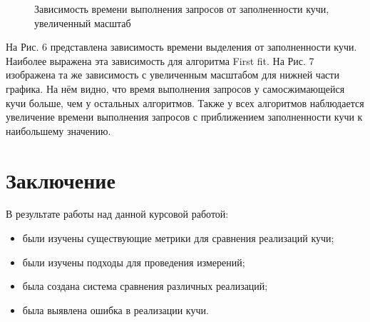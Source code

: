 \documentclass[12pt,a4paper]{article}
\begin{document}
   \begin{figure}[p]
   \caption{Зависимость времени выполнения запросов от заполненности кучи, увеличенный масштаб}
   \label{ris:image}
   \end{figure}
   
   На Рис. 6 представлена зависимость времени выделения от заполненности кучи. Наиболее выражена эта зависимость для алгоритма First fit. На Рис. 7 изображена та же
   зависимость с увеличенным масштабом для нижней части графика. На нём видно, что время выполнения запросов у самосжимающейся кучи больше, чем у остальных 
   алгоритмов. Также у всех алгоритмов наблюдается увеличение времени выполнения запросов с приближением заполненности кучи к наибольшему значению.
   
   \newpage
   \section{Заключение}
   
   В результате работы над данной курсовой работой:
   
    \begin{itemize}
     \item были изучены существующие метрики для сравнения реализаций кучи;
     \item были изучены подходы для проведения измерений;
     \item была создана система сравнения различных реализаций;
     \item была выявлена ошибка в реализации кучи.
    \end{itemize}
    
    
\newpage


\end{document}
